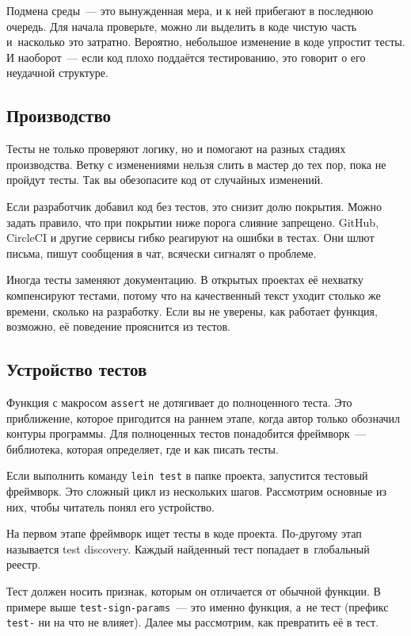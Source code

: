 Подмена среды~--- это вынужденная мера, и к ней прибегают в последнюю
очередь. Для начала проверьте, можно ли выделить в коде чистую часть и~насколько
это затратно. Вероятно, небольшое изменение в коде упростит тесты. И
наоборот~--- если код плохо поддаётся тестированию, это говорит о его неудачной
структуре.

\subsection{Производство}


Тесты не только проверяют логику, но и помогают на разных стадиях
производства. Ветку с изменениями нельзя слить в мастер до тех пор, пока не
пройдут тесты. Так вы обезопасите код от случайных изменений.

Если разработчик добавил код без тестов, это снизит долю покрытия. Можно задать
правило, что при покрытии ниже порога слияние запрещено. GitHub, CircleCI и
другие сервисы гибко реагируют на ошибки в тестах. Они шлют письма, пишут
сообщения в чат, всячески сигналят о проблеме.

Иногда тесты заменяют документацию. В открытых проектах её нехватку компенсируют
тестами, потому что на качественный текст уходит столько же времени, сколько на
разработку. Если вы не уверены, как работает функция, возможно, её поведение
прояснится из тестов.

\subsection{Устройство тестов}

Функция с макросом \verb|assert| не дотягивает до полноценного теста. Это
приближение, которое пригодится на раннем этапе, когда автор только обозначил
контуры программы. Для полноценных тестов понадобится фреймворк~--- библиотека,
которая определяет, где и как писать тесты.

Если выполнить команду \verb|lein test| в папке проекта, запустится тестовый
фреймворк. Это сложный цикл из нескольких шагов. Рассмотрим основные из них,
чтобы читатель понял его устройство.

На первом этапе фреймворк ищет тесты в коде проекта. По-другому этап называется
test discovery. Каждый найденный тест попадает в~глобальный реестр.

Тест должен носить признак, которым он отличается от обычной функции. В примере
выше \verb|test-sign-params|~--- это именно функция, а~не тест (префикс \verb|test-|
ни на что не влияет). Далее мы рассмотрим, как превратить её в тест.


